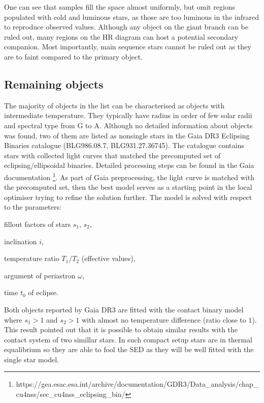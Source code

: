 \documentclass{pracalicmgr}
\newenvironment{itemize*}%
  {\vspace{-\topsep}
    \begin{itemize}%
    \setlength{\itemsep}{0pt}%
    \setlength{\parskip}{0pt}}%
  {\end{itemize}
  \vspace{-\topsep}}
\begin{document}
One can see that samples fill the space almost uniformly, but omit regions populated with cold and luminous stars, as those are too luminous in the infrared to reproduce observed values.
Although any object on the giant branch can be ruled out, many regions on the HR diagram can host a potential secondary companion. 
Most importantly, main sequence stars cannot be ruled out as they are to faint compared to the primary object.
\newpage
\subsection{Remaining objects}
The majority of objects in the list can be characterised as objects with intermediate temperature. They typically have radius in order of
few solar radii and spectral type from G to A.
Although no detailed information about objects was found, two of them
are listed as nonsingle stars in the Gaia DR3 Eclipsing Binaries catalogue (BLG986.08.7, BLG931.27.36745).
The catalogue contains stars with collected light curves that matched the precomputed set of eclipsing/ellipsoidal binaries. 
Detailed processing steps can be found in the Gaia documentation \footnote[1]{https://gea.esac.esa.int/archive/documentation/GDR3/Data\_analysis/chap\_cu4nss/sec\_cu4nss\_eclipsing\_bin/}.
As part of Gaia preprocessing, the light curve is matched with the precomputed set, then the best model serves as a starting point in the local optimiser trying to refine the solution further.
The model is solved with respect to the parameters:
\begin{itemize*}
    \item fillout factors of stars $s_1$, $s_2$,
    \item inclination $i$,
    \item temperature ratio $T_1/T_2$ (effective values),
    \item argument of periastron $\omega$,
    \item time $t_0$ of eclipse.
\end{itemize*}
Both objects reported by Gaia DR3 are fitted with the contact binary model where $s_1>1$ and $s_2>1$ with almost no
temperature difference (ratio close to $1$). This result pointed out that it is possible to obtain similar results
with the contact system of two simillar stars. In such compact setup stars are in thermal equalibrium so they are able to fool the SED as
they will be well fitted with the single star model. 
\end{document}

